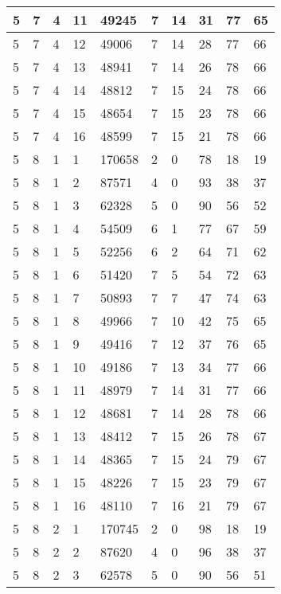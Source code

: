 \begin{table}[!ht]
\begin{tabular}{|l|l|l|l|l|l|l|l|l|l|}
        5 & 7 & 4 & 11 & 49245 & 7 & 14 & 31 & 77 & 65 \\ \hline
        5 & 7 & 4 & 12 & 49006 & 7 & 14 & 28 & 77 & 66 \\ \hline
        5 & 7 & 4 & 13 & 48941 & 7 & 14 & 26 & 78 & 66 \\ \hline
        5 & 7 & 4 & 14 & 48812 & 7 & 15 & 24 & 78 & 66 \\ \hline
        5 & 7 & 4 & 15 & 48654 & 7 & 15 & 23 & 78 & 66 \\ \hline
        5 & 7 & 4 & 16 & 48599 & 7 & 15 & 21 & 78 & 66 \\ \hline
        5 & 8 & 1 & 1 & 170658 & 2 & 0 & 78 & 18 & 19 \\ \hline
        5 & 8 & 1 & 2 & 87571 & 4 & 0 & 93 & 38 & 37 \\ \hline
        5 & 8 & 1 & 3 & 62328 & 5 & 0 & 90 & 56 & 52 \\ \hline
        5 & 8 & 1 & 4 & 54509 & 6 & 1 & 77 & 67 & 59 \\ \hline
        5 & 8 & 1 & 5 & 52256 & 6 & 2 & 64 & 71 & 62 \\ \hline
        5 & 8 & 1 & 6 & 51420 & 7 & 5 & 54 & 72 & 63 \\ \hline
        5 & 8 & 1 & 7 & 50893 & 7 & 7 & 47 & 74 & 63 \\ \hline
        5 & 8 & 1 & 8 & 49966 & 7 & 10 & 42 & 75 & 65 \\ \hline
        5 & 8 & 1 & 9 & 49416 & 7 & 12 & 37 & 76 & 65 \\ \hline
        5 & 8 & 1 & 10 & 49186 & 7 & 13 & 34 & 77 & 66 \\ \hline
        5 & 8 & 1 & 11 & 48979 & 7 & 14 & 31 & 77 & 66 \\ \hline
        5 & 8 & 1 & 12 & 48681 & 7 & 14 & 28 & 78 & 66 \\ \hline
        5 & 8 & 1 & 13 & 48412 & 7 & 15 & 26 & 78 & 67 \\ \hline
        5 & 8 & 1 & 14 & 48365 & 7 & 15 & 24 & 79 & 67 \\ \hline
        5 & 8 & 1 & 15 & 48226 & 7 & 15 & 23 & 79 & 67 \\ \hline
        5 & 8 & 1 & 16 & 48110 & 7 & 16 & 21 & 79 & 67 \\ \hline
        5 & 8 & 2 & 1 & 170745 & 2 & 0 & 98 & 18 & 19 \\ \hline
        5 & 8 & 2 & 2 & 87620 & 4 & 0 & 96 & 38 & 37 \\ \hline
        5 & 8 & 2 & 3 & 62578 & 5 & 0 & 90 & 56 & 51 \\ \hline

\end{tabular}
\end{table}
